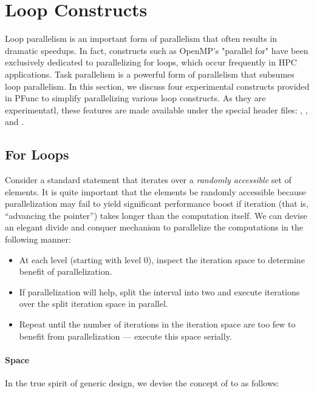 \section{Loop Constructs}
\label{sec:loops}

Loop parallelism is an important form of parallelism that often results in
dramatic speedups. 
%
In fact, constructs such as OpenMP's "parallel for" have been exclusively
dedicated to parallelizing for loops, which occur frequently in HPC
applications.
%
Task parallelism is a powerful form of parallelism that subsumes loop
parallelism. 
%
In this section, we discuss four experimental constructs provided in PFunc 
to simplify parallelizing various loop constructs.
%
As they are experimentatl, these features are made available under the special
header files: ,
, and
.

\subsection{For Loops}
\label{subsec:for}
Consider a standard  statement that iterates over a \textit{randomly
accessible} set of elements. 
%
It is quite important that the elements be randomly accessible because
parallelization may fail to yield significant performance boost if iteration
(that is, ``advancing the pointer'') takes longer than the computation itself.
%
We can devise an elegant divide and conquer mechanism to parallelize the 
computations in the following manner:

\begin{itemize}
\item At each level (starting with level 0), inspect the iteration space to
determine benefit of parallelization.
\item If parallelization will help, split the interval into two and execute
iterations over the split iteration space in parallel.
\item Repeat until the number of iterations in the iteration space are too few
to benefit from parallelization --- execute this space serially.
\end{itemize}

\paragraph{Space} In the true spirit of generic design, we devise the concept
of  to as follows:


